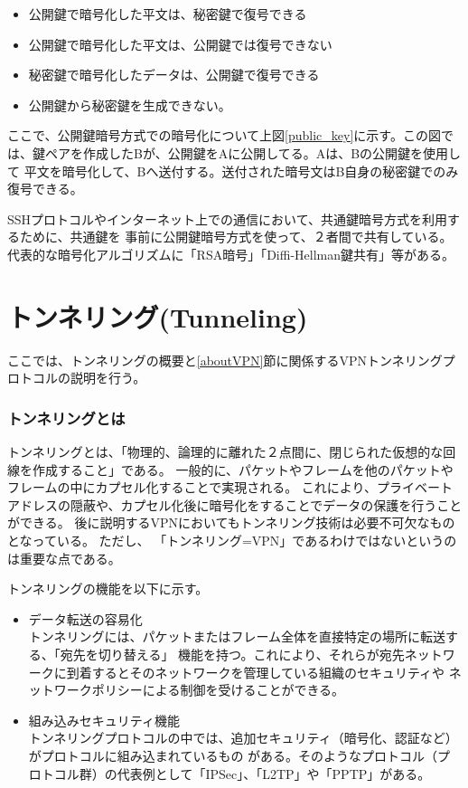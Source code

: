 \documentclass[11pt,a4j,titlepage]{jreport}
\begin{document}
\begin{itemize}
    \item 公開鍵で暗号化した平文は、秘密鍵で復号できる
    \item 公開鍵で暗号化した平文は、公開鍵では復号できない
    \item 秘密鍵で暗号化したデータは、公開鍵で復号できる
    \item 公開鍵から秘密鍵を生成できない。
\end{itemize}
\fi

ここで、公開鍵暗号方式での暗号化について上図\ref{public_key}に示す。この図では、鍵ペアを作成したBが、公開鍵をAに公開してる。Aは、Bの公開鍵を使用して
平文を暗号化して、Bへ送付する。送付された暗号文はB自身の秘密鍵でのみ復号できる。

SSHプロトコルやインターネット上での通信において、共通鍵暗号方式を利用するために、共通鍵を
事前に公開鍵暗号方式を使って、２者間で共有している。
代表的な暗号化アルゴリズムに「RSA暗号」「Diffi-Hellman鍵共有」等がある。

\section{トンネリング(Tunneling)}\label{Tunnel}
ここでは、トンネリングの概要と\ref{aboutVPN}節に関係するVPNトンネリングプロトコルの説明を行う。

\subsubsection*{トンネリングとは}
トンネリングとは、「物理的、論理的に離れた２点間に、閉じられた仮想的な回線を作成すること」である。
一般的に、パケットやフレームを他のパケットやフレームの中にカプセル化することで実現される。
これにより、プライベートアドレスの隠蔽や、カプセル化後に暗号化をすることでデータの保護を行うことができる。
後に説明するVPNにおいてもトンネリング技術は必要不可欠なものとなっている。
ただし、
「トンネリング=VPN」であるわけではないというのは重要な点である。

\par トンネリングの機能を以下に示す。
\begin{itemize}
    \item データ転送の容易化 \mbox{}\\
    トンネリングには、パケットまたはフレーム全体を直接特定の場所に転送する、「宛先を切り替える」
    機能を持つ。これにより、それらが宛先ネットワークに到着するとそのネットワークを管理している組織のセキュリティや
    ネットワークポリシーによる制御を受けることができる。
    \item 組み込みセキュリティ機能\mbox{}\\
    トンネリングプロトコルの中では、追加セキュリティ（暗号化、認証など）がプロトコルに組み込まれているもの
    がある。そのようなプロトコル（プロトコル群）の代表例として「IPSec」、「L2TP」や「PPTP」がある。
\end{itemize}
\end{document}
